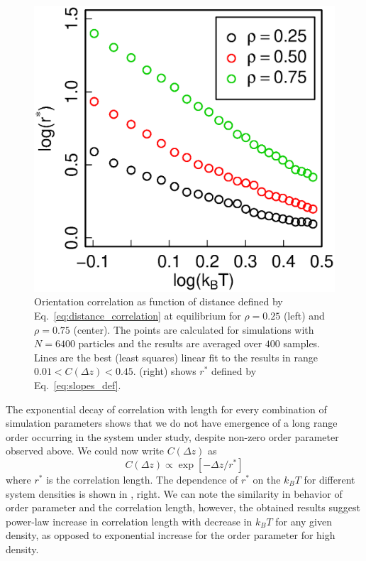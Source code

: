 \begin{figure}[t]
\begin{minipage}[c]{0.32\textwidth}
\end{minipage}
\begin{minipage}[c]{0.32\textwidth}
	\includegraphics[width=\textwidth]{Images/correlation_length_eq}
\end{minipage}
	\caption{Orientation correlation as function of distance defined by Eq.~\eqref{eq:distance_correlation} at equilibrium for $\rho = 0.25$ (left) and $\rho = 0.75$ (center). The points are calculated for simulations with $N = 6400$ particles and the results are averaged over $400$ samples. Lines are the best (least squares) linear fit to the results in range $0.01 < C(\Delta z) < 0.45$. (right) shows $r^*$ defined by Eq.~\eqref{eq:slopes_def}.}
	\label{fig:dist_corr_eq}
\end{figure}

The exponential decay of correlation with length for every combination of simulation parameters shows that we do not have emergence of a long range order occurring in the system under study, despite non-zero order parameter observed above. We could now write $C(\Delta z)$ as
\begin{equation}
	\label{eq:slopes_def}
	C(\Delta z) \propto \exp\left[-\Delta z / r^* \right]
\end{equation}
where $r^*$ is the correlation length. The dependence of $r^*$ on the $k_BT$ for different system densities is shown in , right. We can note the similarity in behavior of order parameter and the correlation length, however, the obtained results suggest power-law increase in correlation length with decrease in $k_BT$ for any given density, as opposed to exponential increase for the order parameter for high density.

